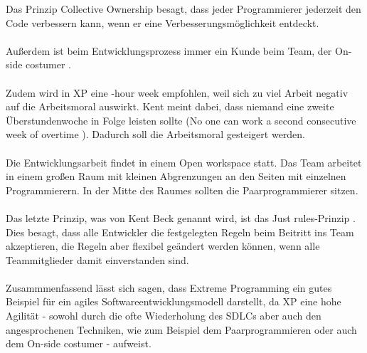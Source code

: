 \documentclass[a4paper, 10pt]{scrartcl}
\begin{document}
Das Prinzip \glqq Collective Ownership\grqq{} \citep{beck1999} besagt, dass jeder Programmierer jederzeit den Code verbessern kann, wenn er eine Verbesserungsmöglichkeit entdeckt.\\\\
Außerdem ist beim Entwicklungsprozess immer ein Kunde beim Team, der \glqq On-side costumer\grqq{} \citep{beck1999}.\\\\
Zudem wird in XP eine -hour week\grqq{} \citep{beck1999} empfohlen, weil sich zu viel Arbeit negativ auf die Arbeitsmoral auswirkt. Kent meint dabei, dass niemand eine zweite Überstundenwoche in Folge leisten sollte (\glqq No one can work a second consecutive week of overtime\grqq{} \cite{beck1999}). Dadurch soll die Arbeitsmoral gesteigert werden.\\\\
Die Entwicklungsarbeit findet in einem \glqq Open workspace\grqq{} \citep{beck1999} statt. Das Team arbeitet in einem großen Raum mit kleinen Abgrenzungen an den Seiten mit einzelnen Programmierern. In der Mitte des Raumes sollten die Paarprogrammierer sitzen.\\\\
Das letzte Prinzip, was von Kent Beck genannt wird, ist das \glqq Just rules\grqq -Prinzip \citep{beck1999}. Dies besagt, dass alle Entwickler die festgelegten Regeln beim Beitritt ins Team akzeptieren, die Regeln aber flexibel geändert werden können, wenn alle Teammitglieder damit einverstanden sind.\\\\
Zusammmenfassend lässt sich sagen, dass Extreme Programming ein gutes Beispiel für ein agiles Softwareentwicklungsmodell darstellt, da XP eine hohe Agilität - sowohl durch die ofte Wiederholung des SDLCs aber auch den angesprochenen Techniken, wie zum Beispiel dem Paarprogrammieren oder auch dem On-side costumer - aufweist.
\end{document}
